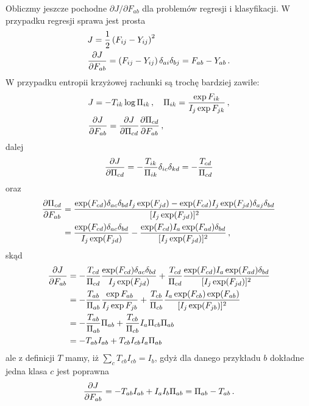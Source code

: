 \documentclass{myclass}
\begin{document}
Obliczmy jeszcze pochodne \(\partial J/\partial F_{ab}\) dla problemów regresji i klasyfikacji. W
przypadku regresji sprawa jest prosta
\begin{equation*}
    \begin{split}
        &J = \frac{1}{2}\left(F_{ij} - Y_{ij}\right)^2\\
        &\pdv{J}{F_{ab}} = \left(F_{ij} - Y_{ij}\right)\delta_{ai}\delta_{bj} = F_{ab} - Y_{ab}\,.
    \end{split}
\end{equation*}
W przypadku entropii krzyżowej rachunki są trochę bardziej zawiłe:
\begin{equation*}
    \begin{split}
        &J = -T_{ik}\log\Pi_{ik}\,,\quad \Pi_{ik} = \frac{\exp F_{ik}}{I_j \exp F_{jk}}\,,\\
        &\pdv{J}{F_{ab}} = \pdv{J}{\Pi_{cd}}\pdv{\Pi_{cd}}{F_{ab}}\,,
    \end{split}
\end{equation*}
dalej
\begin{equation*}
    \pdv{J}{\Pi_{cd}} = -\frac{T_{ik}}{\Pi_{ik}}\delta_{ic}\delta_{kd} = - \frac{T_{cd}}{\Pi_{cd}}
\end{equation*}
oraz
\begin{equation*}
    \begin{split}
        \pdv{\Pi_{cd}}{F_{ab}} &= \frac{\exp(F_{cd})\delta_{ac}\delta_{bd}I_j\exp(F_{jd}) - \exp(F_{cd})I_j\exp(F_{jd})\delta_{aj}\delta_{bd}}{[I_j \exp(F_{jd})]^2}\\
        &= \frac{\exp(F_{cd})\delta_{ac}\delta_{bd}}{I_j\exp(F_{jd})} - \frac{\exp(F_{cd})I_a\exp(F_{ad})\delta_{bd}}{[I_j \exp(F_{jd})]^2}\,,
    \end{split}
\end{equation*}
skąd
\begin{equation*}
    \begin{split}
        \pdv{J}{F_{ab}} &= - \frac{T_{cd}}{\Pi_{cd}}\frac{\exp(F_{cd})\delta_{ac}\delta_{bd}}{I_j\exp(F_{jd})} + \frac{T_{cd}}{\Pi_{cd}}\frac{\exp(F_{cd})I_a\exp(F_{ad})\delta_{bd}}{[I_j \exp(F_{jd})]^2} \\
        &= -\frac{T_{ab}}{\Pi_{ab}}\frac{\exp F_{ab}}{I_j \exp F_{jb}} + \frac{T_{cb}}{\Pi_{cb}}\frac{I_a \exp(F_{cb})\exp(F_{ab})}{[I_j \exp(F_{jb})]^2}\\
        &= -\frac{T_{ab}}{\Pi_{ab}}\Pi_{ab} + \frac{T_{cb}}{\Pi_{cb}}I_a \Pi_{cb}\Pi_{ab}\\
        &= - T_{ab}I_{ab} + T_{cb}I_{cb}I_a\Pi_{ab}
    \end{split}
\end{equation*}
ale z definicji \(T\) mamy, iż \(\sum_{c}T_{cb}I_{cb} = I_b\), gdyż dla danego przykładu \(b\)
dokładne jedna klasa \(c\) jest poprawna
\begin{equation*}
    \pdv{J}{F_{ab}} = - T_{ab}I_{ab} + I_aI_b\Pi_{ab} = \Pi_{ab} - T_{ab}\,.
\end{equation*}
\end{document}
